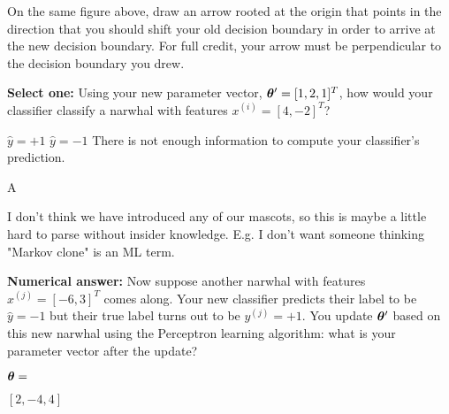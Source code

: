 \begin{parts}
\begin{subparts}
        On the same figure above, draw an arrow rooted at the origin that points in the direction that you should shift your old decision boundary in order to arrive at the new decision boundary. For full credit, your arrow must be perpendicular to the decision boundary you drew. 
        
        \subpart[1] \textbf{Select one:} Using your new parameter vector, $\boldsymbol \theta' = [1, 2, 1]^T$, how would your classifier classify a narwhal with features $x^{(i)} = [4, -2]^T$?
        \begin{checkboxes}
            \choice $\hat{y}=+1$
            \choice $\hat{y}=-1$
            \choice There is not enough information to compute your classifier's prediction.
        \end{checkboxes}
        \begin{soln}
            A
        \end{soln}
        \begin{qtester}
            I don't think we have introduced any of our mascots, so this is maybe a little hard to parse without insider knowledge. E.g. I don't want someone thinking "Markov clone" is an ML term.
        \end{qtester}
        
        \subpart[2] \textbf{Numerical answer:} Now suppose another narwhal with features $x^{(j)} = [-6, 3]^T$ comes along. Your new classifier predicts their label to be $\hat{y}=-1$ but their true label turns out to be $y^{(j)}=+1$. You update $\boldsymbol \theta'$ based on this new narwhal using the Perceptron learning algorithm: what is your parameter vector after the update? 
    
        $\boldsymbol \theta = $ \begin{tcolorbox}[fit,height=1cm, width=6cm, blank, borderline={1pt}{-2pt}, nobeforeafter=false]
            \begin{soln}
                $[2, -4, 4]$
            \end{soln}
        \end{tcolorbox}
        
        \begin{comment}
            \subpart[2] \textbf{Short answer:} What is the effect of the change in bias term on the decision boundary? Justify why this decreases the mistakes (or errors) that the decision boundary makes.
            \fillwithlines{2em}
            \begin{soln}
                The bias term increased by one, which means that the decision boundary moves toward the negative points, which allows for the positive space to increase and thus allow for potentially more examples with positive labels to be classified correctly.
            \end{soln}
            \begin{qtester}
                The answer you are looking for is very specific. I think most people will just say that the line will no longer pass through the origin. We may want to ask something about in which direction will the line shift
            \end{qtester}
            

\end{comment}
\end{subparts}
\end{parts}
